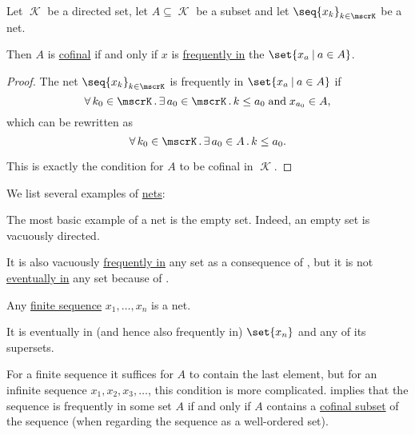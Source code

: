 \begin{proposition}\label{thm:cofinal_iff_frequently_in}
  Let \( \mscrK \) be a directed set, let \( A \subseteq \mscrK \) be a subset and let \( \seq{ x_k }_{k \in \mscrK} \) be a net.

  Then \( A \) is \hyperref[def:cofinal_set]{cofinal} if and only if \( x \) is \hyperref[def:net_frequently_in]{frequently in} the \( \set{ x_a \given a \in A } \).
\end{proposition}
\begin{proof}
  The net \( \seq{ x_k }_{k \in \mscrK} \) is frequently in \( \set{ x_a \given a \in A } \) if
  \begin{equation*}
    \qforall {k_0 \in \mscrK} \qexists {a_0 \in \mscrK} k \leq a_0 \T{and} x_{a_0} \in A,
  \end{equation*}
  which can be rewritten as
  \begin{equation*}
    \qforall {k_0 \in \mscrK} \qexists {a_0 \in A} k \leq a_0.
  \end{equation*}

  This is exactly the condition for \( A \) to be cofinal in \( \mscrK \).
\end{proof}

\begin{example}\label{ex:def:topological_net}
  We list several examples of \hyperref[def:topological_net]{nets}:
  \begin{thmenum}
     The most basic example of a net is the empty set. Indeed, an empty set is vacuously directed.

    It is also vacuously \hyperref[def:net_frequently_in]{frequently in} any set as a consequence of , but it is not \hyperref[def:net_eventually_in]{eventually in} any set because of .

     Any \hyperref[def:sequence]{finite sequence} \( x_1, \ldots, x_n \) is a net.

    It is eventually in (and hence also frequently in) \( \set{ x_n } \) and any of its supersets.

     For a finite sequence it suffices for \( A \) to contain the last element, but for an infinite sequence \( x_1, x_2, x_3, \ldots \), this condition is more complicated.  implies that the sequence is frequently in some set \( A \) if and only if \( A \) contains a \hyperref[def:cofinal_set]{cofinal subset} of the sequence (when regarding the sequence as a well-ordered set).
  \end{thmenum}
\end{example}

